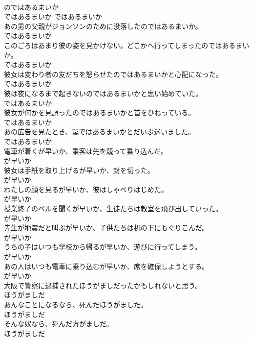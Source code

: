 \documentclass[8pt]{extreport}
\begin{document}
\begin{CJK}{UTF8}{min}
\\	のではあるまいか	
\\	ではあるまいか	ではあるまいか
\\	あの男の父親がジョンソンのために没落したのではあるまいか。	
\\	ではあるまいか
\\	このごろはあまり彼の姿を見かけない。どこかへ行ってしまったのではあるまいか。	
\\	ではあるまいか
\\	彼女は変わり者の友だちを怒らせたのではあるまいかと心配になった。	
\\	ではあるまいか
\\	彼は夜になるまで起きないのではあるまいかと思い始めていた。	
\\	ではあるまいか
\\	彼女が何かを見誤ったのではあるまいかと首をひねっている。	
\\	ではあるまいか
\\	あの広告を見たとき、罠ではあるまいかとだいぶ迷いました。	
\\	ではあるまいか
\\	電車が着くが早いか、乗客は先を競って乗り込んだ。	
\\	が早いか
\\	彼女は手紙を取り上げるが早いか、封を切った。	
\\	が早いか
\\	わたしの顔を見るが早いか、彼はしゃべりはじめた。	
\\	が早いか
\\	授業終了のベルを聞くが早いか、生徒たちは教室を飛び出していった。	
\\	が早いか
\\	先生が地震だと叫ぶが早いか、子供たちは机の下にもぐりこんだ。	
\\	が早いか
\\	うちの子はいつも学校から帰るが早いか、遊びに行ってしまう。	
\\	が早いか
\\	あの人はいつも電車に乗り込むが早いか、席を確保しようとする。	
\\	が早いか
\\	大阪で警察に逮捕されたほうがましだったかもしれないと思う。	
\\	ほうがましだ
\\	あんなことになるなら、死んだほうがましだ。	
\\	ほうがましだ
\\	そんな奴なら、死んだ方がましだ。	
\\	ほうがましだ

\end{CJK}
\end{document}
